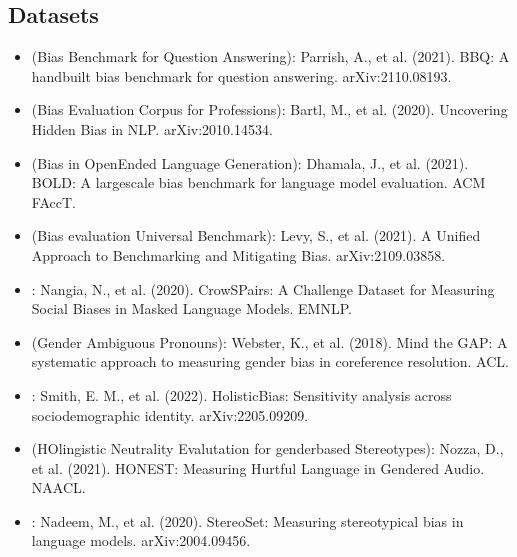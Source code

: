 \documentclass[letterpaper,10pt,english]{sphinxmanual}
\begin{document}
\subsection{Datasets}
\label{\detokenize{citation:datasets}}\begin{itemize}
\item {} 
\sphinxAtStartPar
{} (Bias Benchmark for Question Answering): Parrish, A., et al. (2021). BBQ: A hand\sphinxhyphen{}built bias benchmark for question answering. arXiv:2110.08193.

\item {} 
\sphinxAtStartPar
{} (Bias Evaluation Corpus for Professions): Bartl, M., et al. (2020). Uncovering Hidden Bias in NLP. arXiv:2010.14534.

\item {} 
\sphinxAtStartPar
{} (Bias in Open\sphinxhyphen{}Ended Language Generation): Dhamala, J., et al. (2021). BOLD: A large\sphinxhyphen{}scale bias benchmark for language model evaluation. ACM FAccT.

\item {} 
\sphinxAtStartPar
{} (Bias evaluation Universal Benchmark): Levy, S., et al. (2021). A Unified Approach to Benchmarking and Mitigating Bias. arXiv:2109.03858.

\item {} 
\sphinxAtStartPar
{}: Nangia, N., et al. (2020). CrowS\sphinxhyphen{}Pairs: A Challenge Dataset for Measuring Social Biases in Masked Language Models. EMNLP.

\item {} 
\sphinxAtStartPar
{} (Gender Ambiguous Pronouns): Webster, K., et al. (2018). Mind the GAP: A systematic approach to measuring gender bias in coreference resolution. ACL.

\item {} 
\sphinxAtStartPar
{}: Smith, E. M., et al. (2022). HolisticBias: Sensitivity analysis across sociodemographic identity. arXiv:2205.09209.

\item {} 
\sphinxAtStartPar
{} (HOlingistic Neutrality Evalutation for gender\sphinxhyphen{}based Stereotypes): Nozza, D., et al. (2021). HONEST: Measuring Hurtful Language in Gendered Audio. NAACL.

\item {} 
\sphinxAtStartPar
{}: Nadeem, M., et al. (2020). StereoSet: Measuring stereotypical bias in language models. arXiv:2004.09456.


\end{itemize}
\end{document}
